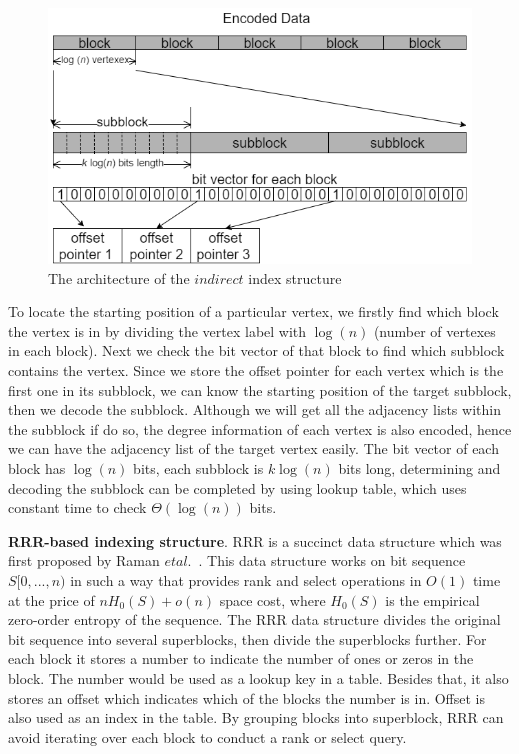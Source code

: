 \documentclass[12pt,glossary]{dalthesis}
\begin{document}
\bigskip

\begin{figure}[ht]
\centering
\includegraphics[width=1.0\textwidth]{indirect}
\caption{The architecture of the $indirect$ index structure}
\end{figure}

\bigskip

To locate the starting position of a particular vertex, we firstly find which block the vertex is in by dividing the vertex label with $\log(n)$ (number of vertexes in each block). Next we check the bit vector of that block to find which subblock contains the vertex. Since we store the offset pointer for each vertex which is the first one in its subblock, we can know the starting position of the target subblock, then we decode the subblock. Although we will get all the adjacency lists within the subblock if do so, the degree information of each vertex is also encoded, hence we can have the adjacency list of the target vertex easily. The bit vector of each block has $\log(n)$ bits, each subblock is $k\log(n)$ bits long, determining and decoding the subblock can be completed by using lookup table, which uses constant time to check $\Theta(\log(n))$ bits.         

\bigskip
\bigskip

\textbf{RRR-based indexing structure}. RRR is a succinct data structure which was first proposed by Raman $et al$.~\cite{RRR}. This data structure works on bit sequence $S[0,...,n)$ in such a way that provides rank and select operations in $O(1)$ time at the price of $nH_{0}(S)+o(n)$ space cost, where $H_{0}(S)$ is the empirical zero-order entropy of the sequence. The RRR data structure divides the original bit sequence into several superblocks, then divide the superblocks further. For each block it stores a number to indicate the number of ones or zeros in the block. The number would be used as a lookup key in a table. Besides that, it also stores an offset which indicates which of the blocks the number is in. Offset is also used as an index in the table. By grouping blocks into superblock, RRR can avoid iterating over each block to conduct a rank or select query.
\end{document}
